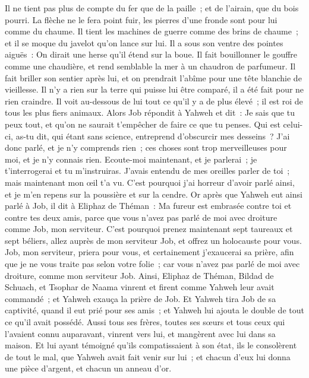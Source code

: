 \begin{multicols}{2}
Il ne tient pas plus de compte du fer que de la paille~; et de l'airain, que du bois pourri. 
La flèche ne le fera point fuir, les pierres d'une fronde sont pour lui comme du chaume.
Il tient les machines de guerre comme des brins de chaume~; et il se moque du javelot qu'on lance sur lui. 
Il a sous son ventre des pointes aiguës~: On dirait une herse qu'il étend sur la boue.
Il fait bouillonner le gouffre comme une chaudière, et rend semblable la mer à un chaudron de parfumeur. 
Il fait briller son sentier après lui, et on prendrait l'abîme pour une tête blanchie de vieillesse.
Il n'y a rien sur la terre qui puisse lui être comparé, il a été fait pour ne rien craindre.
Il voit au-dessous de lui tout ce qu'il y a de plus élevé~; il est roi de tous les plus fiers animaux.
\VerseOne{}Alors Job répondit à Yahweh et dit~:
Je sais que tu peux tout, et qu'on ne saurait t'empêcher de faire ce que tu penses.
Qui est celui-ci, as-tu dit, qui étant sans science, entreprend d'obscurcir mes desseins~? J'ai donc parlé, et je n'y comprends rien~; ces choses sont trop merveilleuses pour moi, et je n'y connais rien.
Ecoute-moi maintenant, et je parlerai~; je t'interrogerai et tu m'instruiras.
J'avais entendu de mes oreilles parler de toi~; mais maintenant mon œil t'a vu.
C'est pourquoi j'ai horreur d'avoir parlé ainsi, et je m'en repens sur la poussière et sur la cendre.
Or après que Yahweh eut ainsi parlé à Job, il dit à Eliphaz de Théman~: Ma fureur est embrasée contre toi et contre tes deux amis, parce que vous n'avez pas parlé de moi avec droiture comme Job, mon serviteur.
C'est pourquoi prenez maintenant sept taureaux et sept béliers, allez auprès de mon serviteur Job, et offrez un holocauste pour vous. Job, mon serviteur, priera pour vous, et certainement j'exaucerai sa prière, afin que je ne vous traite pas selon votre folie~; car vous n'avez pas parlé de moi avec droiture, comme mon serviteur Job.
 Ainsi, Eliphaz de Théman, Bildad de Schuach, et Tsophar de Naama vinrent et firent comme Yahweh leur avait commandé~; et Yahweh exauça la prière de Job.
Et Yahweh tira Job de sa captivité, quand il eut prié pour ses amis~; et Yahweh lui ajouta le double de tout ce qu'il avait possédé.
Aussi tous ses frères, toutes ses sœurs et tous ceux qui l'avaient connu auparavant, vinrent vers lui, et mangèrent avec lui dans sa maison. Et lui ayant témoigné qu'ils compatissaient à son état, ils le consolèrent de tout le mal, que Yahweh avait fait venir sur lui~; et chacun d'eux lui donna une pièce d'argent, et chacun un anneau d'or.

\end{multicols}

